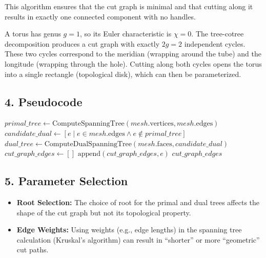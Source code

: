 This algorithm ensures that the cut graph is minimal and that cutting along it results in exactly one connected component with no handles.

\begin{example}\label{ex:cut_graph_torus}
A torus has genus $g = 1$, so its Euler characteristic is $\chi = 0$. The tree-cotree decomposition produces a cut graph with exactly $2g = 2$ independent cycles. These two cycles correspond to the meridian (wrapping around the tube) and the longitude (wrapping through the hole). Cutting along both cycles opens the torus into a single rectangle (topological disk), which can then be parameterized.
\end{example}

\subsection{4. Pseudocode}

\begin{algorithm}
\caption{Find Cut Graph}
\label{alg:find_cut_graph}
\begin{algorithmic}[1]
    \State $primal\_tree \gets \text{ComputeSpanningTree}(mesh.\text{vertices}, mesh.\text{edges})$
    \State $candidate\_dual \gets [e \mid e \in mesh.\text{edges} \wedge e \notin primal\_tree]$
    \State $dual\_tree \gets \text{ComputeDualSpanningTree}(mesh.\text{faces}, candidate\_dual)$
    \State $cut\_graph\_edges \gets []$
            \State $\text{append}(cut\_graph\_edges, e)$
        \EndIf
    \EndFor
    \State \Return $cut\_graph\_edges$
\EndFunction
\end{algorithmic}
\end{algorithm}

\subsection{5. Parameter Selection}

\begin{itemize}
    \item \textbf{Root Selection:} The choice of root for the primal and dual trees affects the shape of the cut graph but not its topological property.
    \item \textbf{Edge Weights:} Using weights (e.g., edge lengths) in the spanning tree calculation (Kruskal's algorithm) can result in ``shorter'' or more ``geometric'' cut paths.
\end{itemize}

